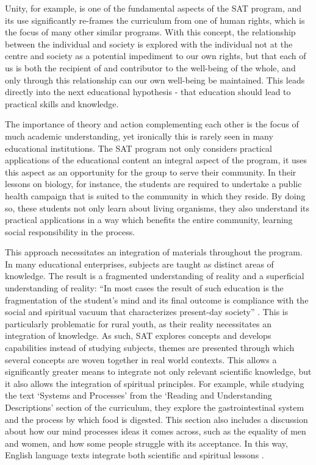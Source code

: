 Unity, for example, is one of the fundamental aspects of the SAT program, and its use significantly re-frames the curriculum from one of human rights, which is the focus of many other similar programs. With this concept, the relationship between the individual and society is explored with the individual not at the centre and society as a potential impediment to our own rights, but that each of us is both the recipient of and contributor to the well-being of the whole, and only through this relationship can our own well-being be maintained. This leads directly into the next educational hypothesis - that education should lead to practical skills and knowledge. 

The importance of theory and action complementing each other is the focus of much academic understanding, yet ironically this is rarely seen in many educational institutions. The SAT program not only considers practical applications of the educational content an integral aspect of the program, it uses this aspect as an opportunity for the group to serve their community. In their lessons on biology, for instance, the students are required to undertake a public health campaign that is suited to the community in which they reside. By doing so, these students not only learn about living organisms, they also understand its practical applications in a way which benefits the entire community, learning social responsibility in the process. 

This approach necessitates an integration of materials throughout the program. In many educational enterprises, subjects are taught as distinct areas of knowledge. The result is a fragmented understanding of reality and a superficial understanding of reality: “In most cases the result of such education is the fragmentation of the student’s mind and its final outcome is compliance with the social and spiritual vacuum that characterizes present-day society” \citep[][p9]{Arbab2007}. This is particularly problematic for rural youth, as their reality necessitates an integration of knowledge. As such, SAT explores concepts and develops capabilities instead of studying subjects, themes are presented through which several concepts are woven together in real world contexts. This allows a significantly greater means to integrate not only relevant scientific knowledge, but it also allows the integration of spiritual principles. For example, while studying the text `Systems and Processes' from the `Reading and Understanding Descriptions' section of the curriculum, they explore the gastrointestinal system and the process by which food is digested. This section also includes a discussion about how our mind processes ideas it comes across, such as the equality of men and women, and how some people struggle with its acceptance. In this way, English language texts integrate both scientific and spiritual lessons \citep{Arbab1988}. 



